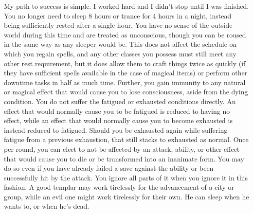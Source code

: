 \begin{optional}
{My path to success is simple. I worked hard and I didn't stop until I was finished.}
{You no longer need to sleep 8 hours or trance for 4 hours in a night, instead being sufficiently rested after a single hour. You have no sense of the outside world during this time and are treated as unconscious, though you can be roused in the same way as any sleeper would be. This does not affect the schedule on which you regain spells, and any other classes you possess must still meet any other rest requirement, but it does allow them to craft things twice as quickly (if they have sufficient spells available in the case of magical items) or perform other downtime tasks in half as much time. Further, you gain immunity to any natural or magical effect that would cause you to lose consciousness, aside from the dying condition.}
{You do not suffer the fatigued or exhausted conditions directly. An effect that would normally cause you to be fatigued is reduced to having no effect, while an effect that would normally cause you to become exhausted is instead reduced to fatigued. Should you be exhausted again while suffering fatigue from a previous exhaustion, that still stacks to exhausted as normal.}
{Once per round, you can elect to not be affected by an attack, ability, or other effect that would cause you to die or be transformed into an inanimate form. You may do so even if you have already failed a save against the ability or been successfully hit by the attack. You ignore all parts of it when you ignore it in this fashion.}
{A good templar may work tirelessly for the advancement of a city or group, while an evil one might work tirelessly for their own.  He can sleep when he wants to, or when he's dead.}


\end{optional}

